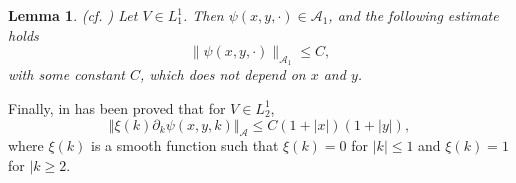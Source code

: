 \documentclass[reqno]{amsart}
\newtheorem{lemma}[theorem]{Lemma}
\numberwithin{equation}{section}
\begin{document}
\begin{lemma}\label{lemconst}(cf. \cite[Lemma 2.3]{EKTM}) Let $V\in L^1_1$.
Then  $\psi(x,y,\cdot)\in\mathcal{A}_1$, and the following estimate holds
\begin{equation}\label{thh}
\| \psi(x,y, \cdot)\|_{\mathcal{A}_1} \le C,
\end{equation}
with some constant $C$, which does not depend on $x$ and $y$.
\end{lemma}
Finally, in \cite{EKTM} has been proved that for $V\in L^1_2$,
\begin{equation}\label{psi-est}
\Vert \xi(k)\partial_k\psi(x,y,k)\Vert_{\mathcal A}\le C(1+|x|)(1+|y|),
\end{equation}
where $\xi(k)$ is a smooth function such that $\xi(k)=0$ for $|k|\le 1$ and
$\xi(k)=1$ for $|k\ge 2$.
\end{document}
